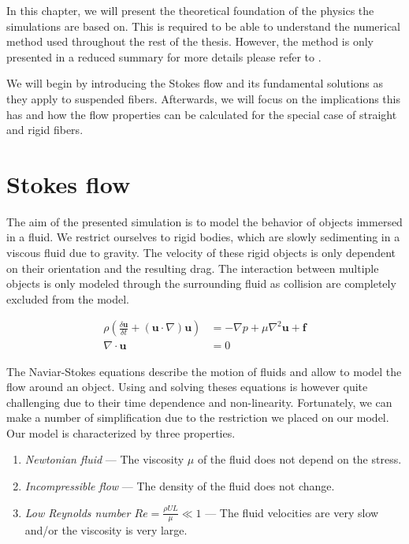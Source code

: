 \documentclass[a4paper,11pt]{kth-mag}
\begin{document}
In this chapter, we will present the theoretical foundation of the physics the simulations are based on. This is required to be able to understand the numerical method used throughout the rest of the thesis. However, the method is only presented in a reduced summary for more details please refer to \cite{}.

We will begin by introducing the Stokes flow and its fundamental solutions as they apply to suspended fibers. Afterwards, we will focus on the implications this has and how the flow properties can be calculated for the special case of straight and rigid fibers.

\section{Stokes flow}

The aim of the presented simulation is to model the behavior of objects immersed in a fluid. We restrict ourselves to rigid bodies, which are slowly sedimenting in a viscous fluid due to gravity. The velocity of these rigid objects is only dependent on their orientation and the resulting drag. The interaction between multiple objects is only modeled through the surrounding fluid as collision are completely excluded from the model.

\begin{equation}
  \label{eq:naviar_stokes_equations}
  \begin{aligned}
    \rho(\frac{\delta \mathbf{u}}{\delta t} + (\mathbf{u} \cdot \nabla)\mathbf{u}) &= -\nabla p + \mu\nabla^2\mathbf{u} + \mathbf{f} \\
    \nabla \cdot \mathbf{u} &= 0
  \end{aligned}
\end{equation}

The Naviar-Stokes equations describe the motion of fluids and allow to model the flow around an object. Using and solving theses equations is however quite challenging due to their time dependence and non-linearity. Fortunately, we can make a number of simplification due to the restriction we placed on our model. Our model is characterized by three properties.

\begin{enumerate}
  \item{\textit{Newtonian fluid} — The viscosity $\mu$ of the fluid does not depend on the stress.}
  \item{\textit{Incompressible flow} — The density of the fluid does not change.}
  \item{\textit{Low Reynolds number $Re = \frac{\rho U L}{\mu} \ll 1$} — The fluid velocities are very slow and/or the viscosity is very large.}
\end{enumerate}
\end{document}
